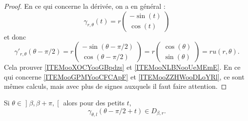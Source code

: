 \begin{proof}
	En ce qui concerne la dérivée, on a en général :
	\begin{equation}
		\gamma_{r,\theta}(t)=r\begin{pmatrix}
			-\sin(t) \\
			\cos(t)
		\end{pmatrix}
	\end{equation}
	et donc
	\begin{equation}
		\gamma'_{r,\theta}(\theta-\pi/2)=r\begin{pmatrix}
			-\sin(\theta-\pi/2) \\
			\cos(\theta-\pi/2)
		\end{pmatrix}=
		r\begin{pmatrix}
			\cos(\theta) \\
			\sin(\theta)
		\end{pmatrix}=ru(r,\theta).
	\end{equation}
	Cela prouver \ref{ITEMooXOCYooGBpdzs} et \ref{ITEMooNLBNooUeMEmE}. En ce qui concerne \ref{ITEMooGPMYooCFCApF} et \ref{ITEMooZZHWooDLoYRl}, ce sont mêmes calculs, mais avec plus de signes auxquels il faut faire attention.
\end{proof}


\begin{proposition}	\label{PROPooTAKFooGsvUhi}
	Si \( \theta\in\mathopen] \beta,\beta+\pi,\mathclose[\) alors pour des petits \( t\),
	\begin{equation}
		\gamma_{\theta,l}(\theta-\pi/2+t)\in D_{\beta,r}.
	\end{equation}
\end{proposition}


